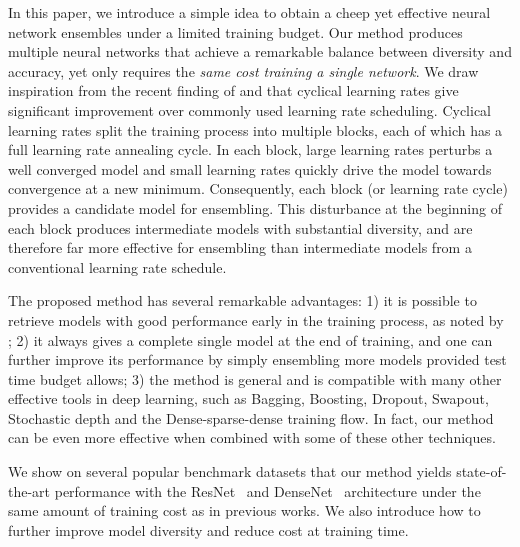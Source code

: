 In this paper, we introduce a simple idea to obtain a cheep yet effective neural network ensembles under a limited training budget.
Our method produces multiple neural networks that achieve a remarkable balance between diversity and accuracy, yet only requires the \emph{same cost training a single network}. We draw inspiration from the recent finding of \cite{loshchilov2016sgdr} and \cite{leslie2016cyclical} that cyclical learning rates give significant improvement over commonly used learning rate scheduling. Cyclical learning rates split the training process into multiple blocks, each of which has a full learning rate annealing cycle. In each block, large learning rates perturbs a well converged model and small learning rates quickly drive the model towards convergence at a new minimum. Consequently, each block (or learning rate cycle) provides a candidate model for ensembling. This disturbance at the beginning of each block produces intermediate models with substantial diversity, and are therefore far more effective for ensembling than intermediate models from a conventional learning rate schedule. 

The proposed method has several remarkable advantages: 1) it is possible to retrieve models with good performance early in the training process, as noted by \citet{loshchilov2016sgdr}; 2) it always gives a complete single model at the end of training, and one can further improve its performance by simply ensembling more models provided test time budget allows;
3) the method is general and is compatible with many other effective tools in deep learning, such as Bagging, Boosting, Dropout, Swapout, Stochastic depth and the Dense-sparse-dense training flow. In fact, our method can be even more effective when combined with some of these other techniques.

We show on several popular benchmark datasets that our method yields state-of-the-art performance with the ResNet~\citep{identity-mappings} and DenseNet~\citep{huang2016densely} architecture under the same amount of training cost as in previous works. We also introduce how to further improve model diversity and reduce cost at training time.








